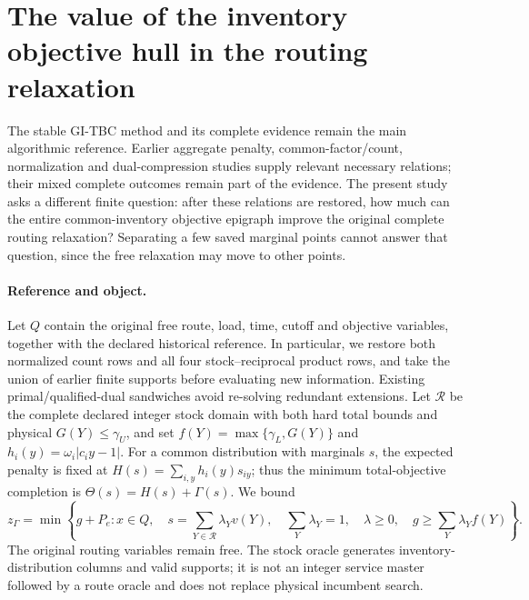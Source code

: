 \section{The value of the inventory objective hull in the routing relaxation}
\label{sec:coupled-inventory-objective}

The stable GI-TBC method and its complete evidence remain the main algorithmic
reference. Earlier aggregate penalty, common-factor/count, normalization and
dual-compression studies supply relevant necessary relations; their mixed
complete outcomes remain part of the evidence. The present study asks a
different finite question: after these relations are restored, how much can
the entire common-inventory objective epigraph improve the original complete
routing relaxation? Separating a few saved marginal points cannot answer
that question, since the free relaxation may move to other points.

\paragraph{Reference and object.}
Let $Q$ contain the original free route, load, time, cutoff and objective
variables, together with the declared historical reference. In particular,
we restore both normalized count rows and all four stock--reciprocal product
rows, and take the union of earlier finite supports before evaluating new
information. Existing primal/qualified-dual sandwiches avoid re-solving
redundant extensions. Let $\mathcal R$ be the complete declared integer stock
domain with both hard total bounds and physical $G(Y)\le\gamma_U$, and set
$f(Y)=\max\{\gamma_L,G(Y)\}$ and
$h_i(y)=\omega_i|c_i y-1|$. For a common distribution with marginals $s$,
the expected penalty is fixed at $H(s)=\sum_{i,y}h_i(y)s_{iy}$; thus the
minimum total-objective completion is $\Theta(s)=H(s)+\Gamma(s)$.
We bound
\[
 z_\Gamma=\min\left\{g+P_e:x\in Q,\quad
 s=\sum_{Y\in\mathcal R}\lambda_Yv(Y),\quad
 \sum_Y\lambda_Y=1,\quad\lambda\ge0,\quad
 g\ge\sum_Y\lambda_Y f(Y)\right\}.
\]
The original routing variables remain free. The stock oracle generates
inventory-distribution columns and valid supports; it is not an integer
service master followed by a route oracle and does not replace physical
incumbent search.


